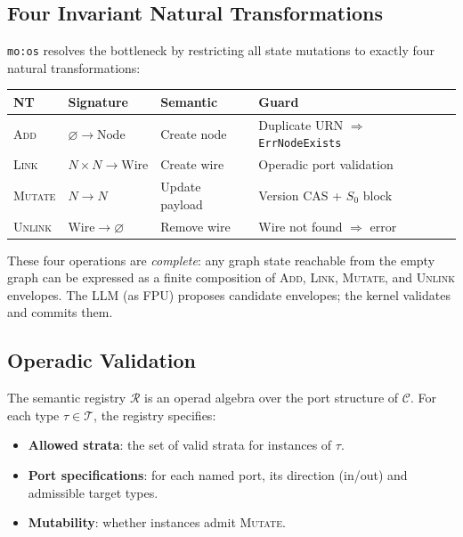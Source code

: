 \documentclass[submission,copyright,creativecommons]{eptcs}
\begin{document}
\subsection{Four Invariant Natural Transformations}

\texttt{mo:os} resolves the bottleneck by restricting all state mutations to
exactly four natural transformations:

\begin{center}
\begin{tabular}{@{}llll@{}}
\toprule
NT & Signature & Semantic & Guard \\
\midrule
\textsc{Add}    & $\varnothing \to \mathrm{Node}$ & Create node &
  Duplicate URN $\Rightarrow$ \texttt{ErrNodeExists} \\
\textsc{Link}   & $N \times N \to \mathrm{Wire}$ & Create wire &
  Operadic port validation \\
\textsc{Mutate} & $N \to N$ & Update payload &
  Version CAS + $S_0$ block \\
\textsc{Unlink} & $\mathrm{Wire} \to \varnothing$ & Remove wire &
  Wire not found $\Rightarrow$ error \\
\bottomrule
\end{tabular}
\end{center}

These four operations are \emph{complete}: any graph state reachable from the
empty graph can be expressed as a finite composition of \textsc{Add},
\textsc{Link}, \textsc{Mutate}, and \textsc{Unlink} envelopes. The LLM (as
FPU) proposes candidate envelopes; the kernel validates and commits them.

\subsection{Operadic Validation}

The semantic registry $\mathcal{R}$ is an operad algebra over the port
structure of $\mathcal{C}$. For each type $\tau \in \mathcal{T}$, the registry
specifies:
\begin{itemize}
  \item \textbf{Allowed strata}: the set of valid strata for instances of $\tau$.
  \item \textbf{Port specifications}: for each named port, its direction
        (in/out) and admissible target types.
  \item \textbf{Mutability}: whether instances admit \textsc{Mutate}.
\end{itemize}
\end{document}
